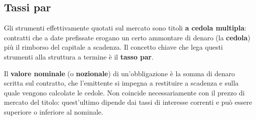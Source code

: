 \documentclass[11pt,a4paper]{article}
\theoremstyle{plain}
\theoremstyle{definition}
\theoremstyle{remark}
\begin{document}
\subsection{Tassi par}
\label{sec:inputdati}

Gli strumenti effettivamente quotati sul mercato sono titoli \textbf{a cedola multipla}:
contratti che a date prefissate erogano un certo ammontare di denaro (la \textbf{cedola})
pi\`u il rimborso del capitale a scadenza. Il concetto chiave che lega questi strumenti
alla struttura a termine \`e il \textbf{tasso par}.

Il \textbf{valore nominale} (o \textbf{nozionale}) di un'obbligazione \`e la somma di
denaro scritta sul contratto, che l'emittente si impegna a restituire a scadenza e sulla
quale vengono calcolate le cedole. Non coincide necessariamente con il prezzo di mercato
del titolo: quest'ultimo dipende dai tassi di interesse correnti e pu\`o essere superiore
o inferiore al nominale.
\end{document}
